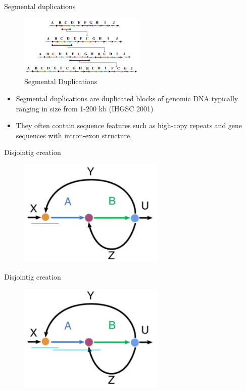 \documentclass{beamer}
\begin{document}
  \begin{frame}{Segmental duplications}
    \begin{figure}
      \includegraphics[width=6cm]{presentation/images/SDs.png}
      \caption*{Segmental Duplications \cite{pevzner_novo_2004}}
      \label{fig:SD}
    \end{figure}
    \begin{itemize}
      \item Segmental duplications are duplicated blocks of genomic DNA typically ranging in size from 1-200 kb (IHGSC 2001)

      \item They often contain sequence features such as high-copy repeats and gene sequences with intron-exon structure. 
    \end{itemize}
  \end{frame}

  \begin{frame}{Disjointig creation}
    \begin{figure}
      \includegraphics[width=7cm]{presentation/images/repeat_graph_dot1.png}
      \label{fig:repgraph1}
    \end{figure}
  \end{frame}

  \begin{frame}{Disjointig creation}
    \begin{figure}
      \includegraphics[width=7cm]{presentation/images/repeat_graph_dot2.png}
      \label{fig:repgraph2}
    \end{figure}
  \end{frame}
\end{document}
